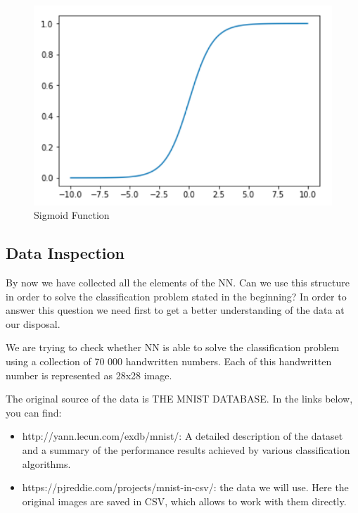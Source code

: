 \begin{itemize}
\begin{figure}[H]
    \includegraphics[width=\linewidth]{pics/sigmoid.png}
    \caption{\label{fig:sigmoid-fct} Sigmoid Function}
\end{figure}

\end{itemize}


\subsection{Data Inspection}

By now we have collected all the elements of the NN. Can we use this structure in order to solve the classification problem stated in the beginning? In order to answer this question we need first to get a better understanding of the data at our disposal. 

We are trying to check whether NN is able to solve the classification problem using a collection of 70 000 handwritten numbers. Each of this handwritten number is represented as 28x28 image. 

The original source of the data is THE MNIST DATABASE. In the links below, you can find: 

\begin{itemize}
    \item http://yann.lecun.com/exdb/mnist/: A detailed description of the dataset and a summary of the performance results achieved by various classification algorithms.
    \item https://pjreddie.com/projects/mnist-in-csv/: the data we will use. Here the original images are saved in CSV, which allows to work with them directly.
\end{itemize}

